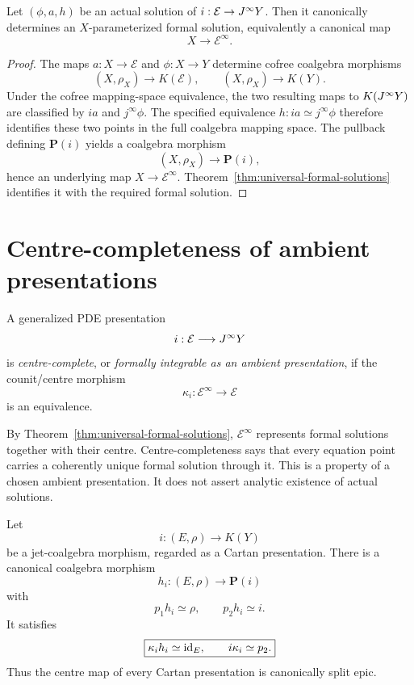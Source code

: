 \begin{proposition}
\label{prop:actual-to-formal-solution}
Let $(\phi,a,h)$ be an actual solution of $i:\mathcal E\to J^{\infty} Y$.  Then it canonically determines an $X$-parameterized formal solution, equivalently a canonical map
\[
    X\longrightarrow\mathcal E^\infty.
\]
\end{proposition}

\begin{proof}
The maps $a:X\to\mathcal E$ and $\phi:X\to Y$ determine cofree coalgebra morphisms
\[
    (X,\rho_X)\to K(\mathcal E),
    \qquad
    (X,\rho_X)\to K(Y).
\]
Under the cofree mapping-space equivalence, the two resulting maps to $K(J^{\infty} Y)$ are classified by $ia$ and $j^\infty\phi$.  The specified equivalence $h:ia\simeq j^\infty\phi$ therefore identifies these two points in the full coalgebra mapping space.  The pullback defining $\mathbf P(i)$ yields a coalgebra morphism
\[
    (X,\rho_X)\longrightarrow\mathbf P(i),
\]
hence an underlying map $X\to\mathcal E^\infty$.  Theorem~\ref{thm:universal-formal-solutions} identifies it with the required formal solution.
\end{proof}

\section{Centre-completeness of ambient presentations}
\label{sec:formal-integrability}

\begin{definition}
\label{def:formal-integrability}
A generalized PDE presentation
\[
    i:\mathcal E\longrightarrow J^{\infty} Y
\]
is \emph{centre-complete}, or \emph{formally integrable as an ambient presentation}, if the counit/centre morphism
\[
    \kappa_i:\mathcal E^\infty\longrightarrow\mathcal E
\]
is an equivalence.
\end{definition}

\begin{remark}
By Theorem~\ref{thm:universal-formal-solutions}, $\mathcal E^\infty$ represents formal solutions together with their centre.  Centre-completeness says that every equation point carries a coherently unique formal solution through it.  This is a property of a chosen ambient presentation.  It does not assert analytic existence of actual solutions.
\end{remark}

\begin{proposition}
\label{prop:cartan-presentation-split-centre}
Let
\[
    i:(E,\rho)\longrightarrow K(Y)
\]
be a jet-coalgebra morphism, regarded as a Cartan presentation.  There is a canonical coalgebra morphism
\[
    h_i:(E,\rho)\longrightarrow\mathbf P(i)
\]
with
\[
    p_1h_i\simeq\rho,
    \qquad
    p_2h_i\simeq i.
\]
It satisfies
\[
    \boxed{
    \kappa_i h_i\simeq\operatorname{id}_E,
    \qquad
    i\kappa_i\simeq p_2.
    }
\]
Thus the centre map of every Cartan presentation is canonically split epic.
\end{proposition}

